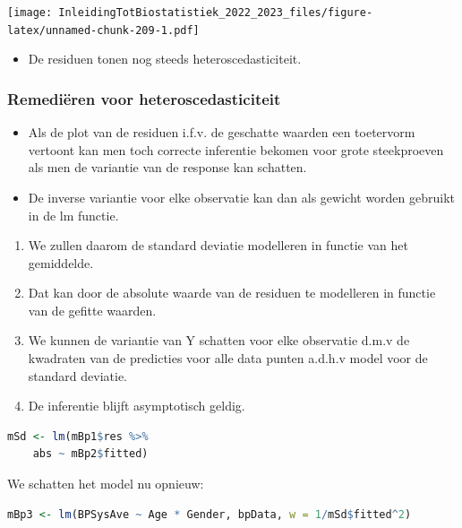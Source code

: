 \documentclass[
  12pt,dutch,coursenotes]{book}
\providecommand{\tightlist}{%
  \setlength{\itemsep}{0pt}\setlength{\parskip}{0pt}}
\begin{document}
\texttt{[image: InleidingTotBiostatistiek\_2022\_2023\_files/figure-latex/unnamed-chunk-209-1.pdf]}

\begin{itemize}
\tightlist
\item
  De residuen tonen nog steeds heteroscedasticiteit.
\end{itemize}

\hypertarget{remediuxebren-voor-heteroscedasticiteit}{%
\subsubsection{Remediëren voor heteroscedasticiteit}\label{remediuxebren-voor-heteroscedasticiteit}}

\begin{itemize}
\tightlist
\item
  Als de plot van de residuen i.f.v. de geschatte waarden een toetervorm vertoont kan men toch correcte inferentie bekomen voor grote steekproeven als men de variantie van de response kan schatten.
\item
  De inverse variantie voor elke observatie kan dan als gewicht worden gebruikt in de lm functie.
\end{itemize}

\begin{enumerate}
\def\labelenumi{\arabic{enumi}.}
\tightlist
\item
  We zullen daarom de standard deviatie modelleren in functie van het gemiddelde.
\item
  Dat kan door de absolute waarde van de residuen te modelleren in functie van de gefitte waarden.
\item
  We kunnen de variantie van Y schatten voor elke observatie d.m.v de kwadraten van de predicties voor alle data punten a.d.h.v model voor de standard deviatie.
\item
  De inferentie blijft asymptotisch geldig.
\end{enumerate}

\begin{lstlisting}[language=R]
mSd <- lm(mBp1$res %>%
    abs ~ mBp2$fitted)
\end{lstlisting}

We schatten het model nu opnieuw:

\begin{lstlisting}[language=R]
mBp3 <- lm(BPSysAve ~ Age * Gender, bpData, w = 1/mSd$fitted^2)
\end{lstlisting}
\end{document}
